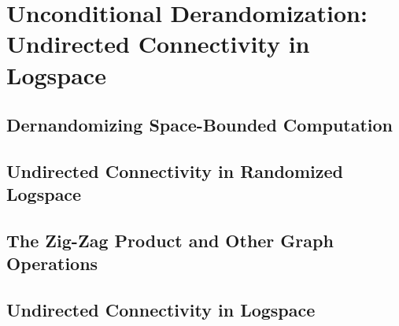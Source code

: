 \chapter{Unconditional Derandomization: Undirected Connectivity in Logspace}
\label{lec:14}

\section{Dernandomizing Space-Bounded Computation}

\section{Undirected Connectivity in Randomized Logspace}

\section{The Zig-Zag Product and Other Graph Operations}

\section{Undirected Connectivity in Logspace}
